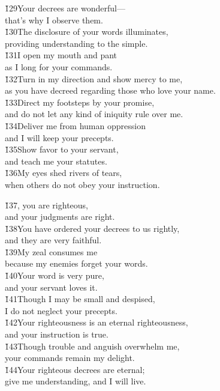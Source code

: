 \begin{poetry}
\poeml \v{129}Your decrees are wonderful--- \\
\poemll    that's why I observe them. \\
\poeml \v{130}The disclosure of your words illuminates, \\
\poemll    providing understanding to the simple. \\
\poeml \v{131}I open my mouth and pant \\
\poemll    as I long for your commands. \\
\poeml \v{132}Turn in my direction and show mercy to me, \\
\poemll    as you have decreed regarding those who love your name. \\
\poeml \v{133}Direct my footsteps by your promise, \\
\poemll    and do not let any kind of iniquity rule over me. \\
\poeml \v{134}Deliver me from human oppression \\
\poemll    and I will keep your precepts. \\
\poeml \v{135}Show favor to your servant, \\
\poemll    and teach me your statutes. \\
\poeml \v{136}My eyes shed rivers of tears, \\
\poemll    when others do not obey your instruction.
\end{poetry}

\begin{poetry}
\poeml \v{137}, you are righteous, \\
\poemll    and your judgments are right. \\
\poeml \v{138}You have ordered your decrees to us rightly, \\
\poemll    and they are very faithful. \\
\poeml \v{139}My zeal consumes me \\
\poemll    because my enemies forget your words. \\
\poeml \v{140}Your word is very pure, \\
\poemll    and your servant loves it. \\
\poeml \v{141}Though I may be small and despised, \\
\poemll    I do not neglect your precepts. \\
\poeml \v{142}Your righteousness is an eternal righteousness, \\
\poemll    and your instruction is true. \\
\poeml \v{143}Though trouble and anguish overwhelm me, \\
\poemll    your commands remain my delight. \\
\poeml \v{144}Your righteous decrees are eternal; \\
\poemll    give me understanding, and I will live.
\end{poetry}

